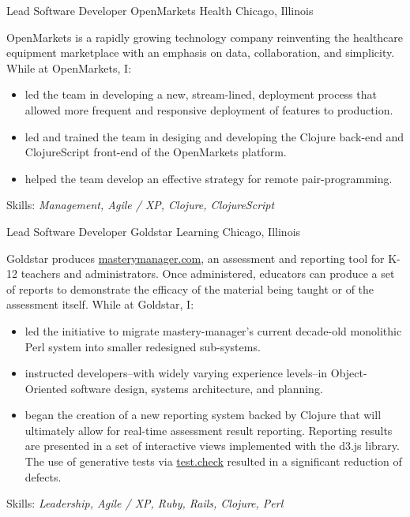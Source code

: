 \documentclass[11pt,letterpaper]{moderncv}
\begin{document}
 {Lead Software Developer}
  {OpenMarkets Health} {Chicago, Illinois} {} { %
  OpenMarkets is a rapidly growing technology company reinventing the
  healthcare equipment marketplace with an emphasis on data, collaboration,
  and simplicity.  While at OpenMarkets, I:
  \begin{itemize}
  \item led the team in developing a new, stream-lined, deployment process
    that allowed more frequent and responsive deployment of features to
    production.
  \item led and trained the team in desiging and developing the Clojure
    back-end and ClojureScript front-end of the OpenMarkets platform.
  \item helped the team develop an effective strategy for remote
    pair-programming.
  \end{itemize}
  Skills: \emph{Management, Agile / XP, Clojure, ClojureScript}
}

 {Lead Software Developer} {Goldstar
  Learning} {Chicago, Illinois} {} { %
  Goldstar produces \href{https://www.masterymanager.com}{masterymanager.com},
  an assessment and reporting tool for K-12 teachers and administrators.  Once
  administered, educators can produce a set of reports to demonstrate the
  efficacy of the material being taught or of the assessment itself.  While at
  Goldstar, I:
  \begin{itemize}
  \item led the initiative to migrate mastery-manager's current decade-old
    monolithic Perl system into smaller redesigned sub-systems.
  \item instructed developers--with widely varying experience
    levels--in Object-Oriented software design, systems architecture,
    and planning.
  \item began the creation of a new reporting system backed by
    Clojure that will ultimately allow for real-time assessment
    result reporting.  Reporting results are presented in a set of
    interactive views implemented with the d3.js library.  The use of
    generative tests via
    \href{https://github.com/clojure/test.check}{test.check} resulted
    in a significant reduction of defects.
  \end{itemize}
  Skills: \emph{Leadership, Agile / XP, Ruby, Rails, Clojure, Perl}
}
\end{document}
